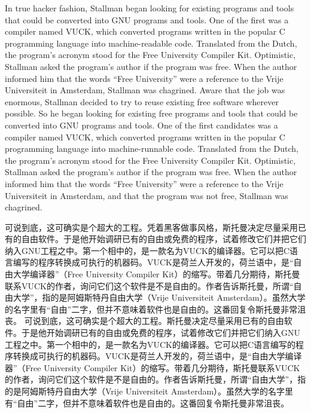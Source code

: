\ifdefined\eng
\ifdefined\vone
In true hacker fashion, Stallman began looking for existing programs and tools that could be converted into GNU programs and tools. One of the first was a compiler named VUCK, which converted programs written in the popular C programming language into machine-readable code. Translated from the Dutch, the program's acronym stood for the Free University Compiler Kit. Optimistic, Stallman asked the program's author if the program was free. When the author informed him that the words ``Free University'' were a reference to the Vrije Universiteit in Amsterdam, Stallman was chagrined.
\fi
\ifdefined\vtwo
Aware that the job was enormous, Stallman decided to try to reuse existing free software wherever possible.  So he began looking for existing free programs and tools that could be converted into GNU programs and tools. One of the first candidates was a compiler named VUCK, which converted programs written in the popular C programming language into machine-runnable code. Translated from the Dutch, the program's acronym stood for the Free University Compiler Kit. Optimistic, Stallman asked the program's author if the program was free. When the author informed him that the words ``Free University'' were a reference to the Vrije Universiteit in Amsterdam, and that the program was not free, Stallman was chagrined.
\fi
\fi

\ifdefined\chs
\ifdefined\vone
可说到底，这可确实是个超大的工程。凭着黑客做事风格，斯托曼决定尽量采用已有的自由软件。于是他开始调研已有的自由或免费的程序，试着修改它们并把它们纳入GNU工程之中。第一个相中的，是一款名为VUCK的编译器。它可以把C语言编写的程序转换成可执行的机器码。VUCK是荷兰人开发的，荷兰语中，是``自由大学编译器''（Free University Compiler Kit）的缩写。带着几分期待，斯托曼联系VUCK的作者，询问它们这个软件是不是自由的。作者告诉斯托曼，所谓``自由大学''，指的是阿姆斯特丹自由大学（Vrije Universiteit Amsterdam）。虽然大学的名字里有``自由''二字，但并不意味着软件也是自由的。这番回复令斯托曼非常沮丧。
\fi
\ifdefined\vtwo
可说到底，这可确实是个超大的工程。斯托曼决定尽量采用已有的自由软件。于是他开始调研已有的自由或免费的程序，试着修改它们并把它们纳入GNU工程之中。第一个相中的，是一款名为VUCK的编译器。它可以把C语言编写的程序转换成可执行的机器码。VUCK是荷兰人开发的，荷兰语中，是``自由大学编译器''（Free University Compiler Kit）的缩写。带着几分期待，斯托曼联系VUCK的作者，询问它们这个软件是不是自由的。作者告诉斯托曼，所谓``自由大学''，指的是阿姆斯特丹自由大学（Vrije Universiteit Amsterdam）。虽然大学的名字里有``自由''二字，但并不意味着软件也是自由的。这番回复令斯托曼非常沮丧。
\fi
\fi

